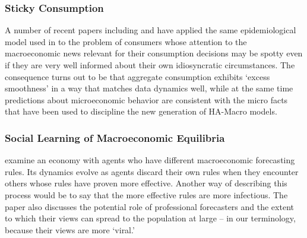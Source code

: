 \subsubsection{Sticky Consumption}

A number of recent papers including \cite{carroll2020sticky} and \cite{auclert2020micro} have applied the same epidemiological model used in \cite{carroll2003macroeconomic} to the problem of consumers whose attention to the macroeconomic news relevant for their consumption decisions may be spotty even if they are very well informed about their own idiosyncratic circumstances.  The consequence turns out to be that aggregate consumption exhibits `excess smoothness' in a way that matches data dynamics well, while at the same time predictions about microeconomic behavior are consistent with the micro facts that have been used to discipline the new generation of HA-Macro models.


\subsubsection{Social Learning of Macroeconomic Equilibria}

\cite{arifovic2018learning} examine an economy with agents who have different macroeconomic forecasting rules.  Its dynamics evolve as agents discard their own rules when they encounter others whose rules have proven more effective.  Another way of describing this process would be to say that the more effective rules are more infectious.    The paper also discusses the potential role of professional forecasters and the extent to which their views can spread to the population at large -- in our terminology, because their views are more `viral.'

